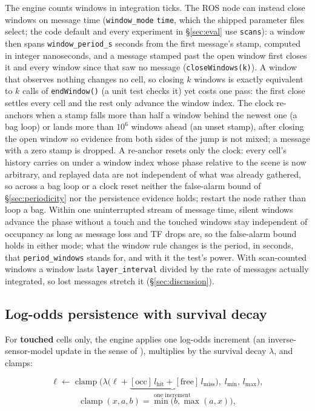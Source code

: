 \documentclass[conference]{IEEEtran}
\begin{document}
The engine counts windows in integration ticks. The ROS node can instead close
windows on message time (\texttt{window\_mode} \texttt{time}, which the shipped
parameter files select; the code default and every experiment in
\S\ref{sec:eval} use \texttt{scans}): a window then spans
\texttt{window\_period\_s} seconds from the first message's stamp, computed in
integer nanoseconds, and a message stamped past the open window first closes it
and every window since that saw no message (\texttt{closeWindows(k)}). A window
that observes nothing changes no cell, so closing $k$ windows is exactly
equivalent to $k$ calls of \texttt{endWindow()} (a unit test checks it) yet
costs one pass: the first close settles every cell and the rest only advance
the window index. The clock re-anchors when a stamp falls more than half a
window behind the newest one (a bag loop) or lands more than $10^6$ windows
ahead (an unset stamp), after closing the open window so evidence from both
sides of the jump is not mixed; a message with a zero stamp is dropped. A
re-anchor resets only the clock: every cell's history carries on under a window
index whose phase relative to the scene is now arbitrary, and replayed data are
not independent of what was already gathered, so across a bag loop or a clock
reset neither the false-alarm bound of \S\ref{sec:periodicity} nor the
persistence evidence holds; restart the node rather than loop a bag. Within one
uninterrupted stream of message time, silent windows advance the phase without a
touch and the touched windows stay independent of occupancy as long as message
loss and TF drops are, so the false-alarm bound holds in either mode; what
the window rule changes is the period, in seconds, that
\texttt{period\_windows} stands for, and with it the test's power. With
scan-counted windows a window lasts \texttt{layer\_interval} divided by the
rate of messages actually integrated, so lost messages stretch it
(\S\ref{sec:discussion}).

\subsection{Log-odds persistence with survival decay}
\label{sec:logodds}

For \textbf{touched} cells only, the engine applies one log-odds increment
(an inverse-sensor-model update in the sense of \cite{thrun2005probabilistic}),
multiplies by the survival decay $\lambda$, and clamps:

\begin{equation}
\ell \leftarrow \operatorname{clamp}\!\Big(\lambda\big(\ell +
\underbrace{[\text{occ}]\,l_{\text{hit}} + [\text{free}]\,l_{\text{miss}}}_{\text{one increment}}\big),\;
l_{\min},\, l_{\max}\Big),
\end{equation}
\begin{equation}
\operatorname{clamp}(x,a,b)=\min\!\big(b,\max(a,x)\big),
\end{equation}
\end{document}
